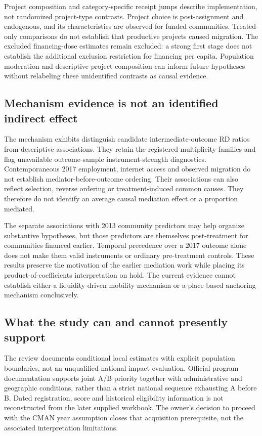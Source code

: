 Project composition and category-specific receipt jumps describe
implementation, not randomized project-type contrasts. Project choice is
post-assignment and endogenous, and its characteristics are observed for
funded communities. Treated-only comparisons do not establish that productive
projects caused migration. The excluded financing-dose estimates remain
excluded: a strong first stage does not establish the additional exclusion
restriction for financing per capita. Population moderation and descriptive
project composition can inform future hypotheses without relabeling these
unidentified contrasts as causal evidence.

\subsection{Mechanism evidence is not an identified indirect effect}

The mechanism exhibits distinguish candidate intermediate-outcome RD ratios
from descriptive associations. They retain the registered multiplicity
families and flag unavailable outcome-sample instrument-strength diagnostics.
Contemporaneous 2017 employment, internet access and observed migration do
not establish mediator-before-outcome ordering. Their associations can also
reflect selection, reverse ordering or treatment-induced common causes.
They therefore do not identify an average causal mediation effect or a
proportion mediated.

The separate associations with 2013 community predictors may help organize
substantive hypotheses, but those predictors are themselves post-treatment
for communities financed earlier. Temporal precedence over a 2017 outcome
alone does not make them valid instruments or ordinary pre-treatment
controls. These results preserve the motivation of the earlier mediation
work while placing its product-of-coefficients interpretation on hold.
The current evidence cannot establish either a liquidity-driven mobility
mechanism or a place-based anchoring mechanism conclusively.

\subsection{What the study can and cannot presently support}

The review documents conditional local estimates with explicit population
boundaries, not an unqualified national impact evaluation. Official program
documentation supports joint A/B priority together with administrative and
geographic conditions, rather than a strict national sequence exhausting A
before B. Dated registration, score and historical eligibility information
is not reconstructed from the later supplied workbook. The owner's decision
to proceed with the CMAN year assumption closes that acquisition prerequisite,
not the associated interpretation limitations.

